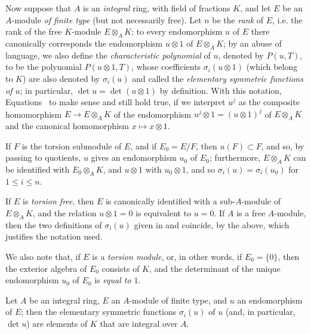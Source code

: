 \begin{env}[6.4.2]
\label{II.6.4.2}
Now suppose that $A$ is an \emph{integral} ring, with field of fractions $K$, and let $E$ be an $A$-module \emph{of finite type} (but not necessarily free).
Let $n$ be the \emph{rank} of $E$, i.e. the rank of the free $K$-module $E\otimes_A K$;
to every endomorphism $u$ of $E$ there canonically corresponds the endomorphism $u\otimes1$ of $E\otimes_A K$;
by an abuse of language, we also define the \emph{characteristic polynomial} of $u$, denoted by $P(u,T)$, to be the polynomial $P(u\otimes1,T)$, whose coefficients $\sigma_i(u\otimes1)$ (which belong to $K$) are also denoted by $\sigma_i(u)$ and called the \emph{elementary symmetric functions of $u$};
in particular, $\det u=\det(u\otimes1)$ by definition.
With this notation, Equations~ to  make sense and still hold true, if we interpret $u^j$ as the composite homomorphism $E\to E\otimes_A K$ of the endomorphism $u^j\otimes1=(u\otimes1)^j$ of $E\otimes_A K$ and the canonical homomorphism $x\mapsto x\otimes1$.

If $F$ is the torsion submodule of $E$, and if $E_0=E/F$, then $u(F)\subset F$, and so, by passing to quotients, $u$ gives an endomorphism $u_0$ of $E_0$;
furthermore, $E\otimes_A K$ can be identified with $E_0\otimes_A K$, and $u\otimes1$ with $u_0\otimes1$, and so $\sigma_i(u)=\sigma_i(u_0)$ for $1\leq i\leq n$.

If $E$ is \emph{torsion free}, then $E$ is canonically identified with a sub-$A$-module of $E\otimes_A K$, and the relation $u\otimes1=0$ is equivalent to $u=0$.
If $A$ is a free $A$-module, then the two definitions of $\sigma_i(u)$ given in  and  coincide, by the above, which justifies the notation used.

We also note that, if $E$ is a \emph{torsion module}, or, in other words, if $E_0=\{0\}$, then the exterior algebra of $E_0$ consists of $K$, and the determinant of the unique endomorphism $u_0$ of $E_0$ is \emph{equal to $1$}.
\end{env}

\begin{proposition}[6.4.3]
\label{II.6.4.3}
Let $A$ be an integral ring, $E$ an $A$-module of finite type, and $u$ an endomorphism of $E$;
then the elementary symmetric functions $\sigma_i(u)$ of $u$ (and, in particular, $\det u$) are elements of $K$ that are integral over $A$.
\end{proposition}

